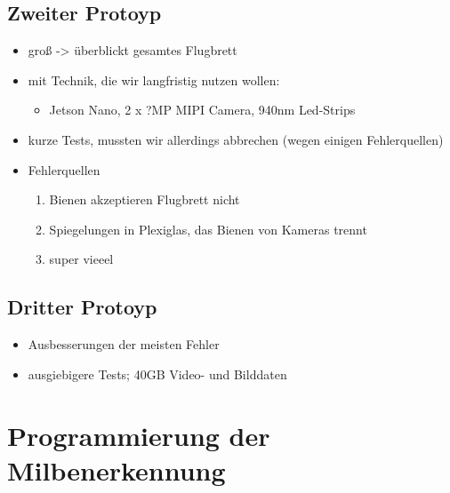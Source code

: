 \documentclass[11pt,a4paper]{article}
\begin{document}
\subsection{Zweiter Protoyp}
\begin{itemize}
    \item groß -> überblickt gesamtes Flugbrett
    \item mit Technik, die wir langfristig nutzen wollen:
    \begin{itemize}
        \item Jetson Nano, 2 x ?MP MIPI Camera, 940nm Led-Strips
    \end{itemize}
    \item kurze Tests, mussten wir allerdings abbrechen (wegen einigen Fehlerquellen)
    \item Fehlerquellen
    \begin{enumerate}
        \item Bienen akzeptieren Flugbrett nicht
        \item Spiegelungen in Plexiglas, das Bienen von Kameras trennt
        \item super vieeel
    \end{enumerate}
\end{itemize}



\subsection{Dritter Protoyp}
\begin{itemize}
    \item Ausbesserungen der meisten Fehler
    \item ausgiebigere Tests; 40GB Video- und Bilddaten
\end{itemize}


\newpage
\section{Programmierung der Milbenerkennung} \label{section:Programmierung}
\end{document}

